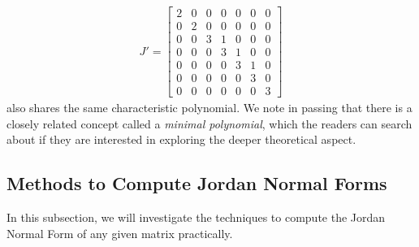\begin{align*}
J' =
\begin{bmatrix}
2 & 0 & 0 & 0 & 0 & 0 & 0 \\
0 & 2 & 0 & 0 & 0 & 0 & 0 \\
0 & 0 & 3 & 1 & 0 & 0 & 0 \\
0 & 0 & 0 & 3 & 1 & 0 & 0 \\
0 & 0 & 0 & 0 & 3 & 1 & 0 \\
0 & 0 & 0 & 0 & 0 & 3 & 0 \\
0 & 0 & 0 & 0 & 0 & 0 & 3
\end{bmatrix}
\end{align*}
also shares the same characteristic polynomial. We note in passing that there is a closely related concept called a \textit{minimal polynomial}, which the readers can search about if they are interested in exploring the deeper theoretical aspect.

\subsection{Methods to Compute Jordan Normal Forms}

In this subsection, we will investigate the techniques to compute the Jordan Normal Form of any given matrix practically.

